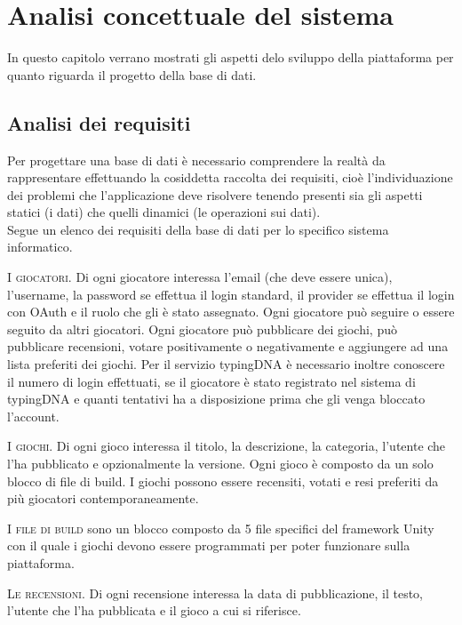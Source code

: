 \chapter{Analisi concettuale del sistema}

In questo capitolo verrano mostrati gli aspetti delo sviluppo della piattaforma per quanto riguarda il progetto della base di dati.\cite{DB}

\section{Analisi dei requisiti}

Per progettare una base di dati è necessario comprendere la realtà da rappresentare effettuando la cosiddetta raccolta dei requisiti, cioè l'individuazione dei problemi che l'applicazione deve risolvere tenendo presenti sia gli aspetti statici (i dati) che quelli dinamici (le operazioni sui dati).\\

Segue un elenco dei requisiti della base di dati per lo specifico sistema informatico. 

\hangindent=1cm
{\scshape I giocatori.} Di ogni giocatore interessa l'email (che deve essere unica), l'username, la password se effettua il login standard, il provider se effettua il login con OAuth e il ruolo che gli è stato assegnato. Ogni giocatore può seguire o essere seguito da altri giocatori. Ogni giocatore può pubblicare dei giochi, può pubblicare recensioni, votare positivamente o negativamente e aggiungere ad una lista preferiti dei giochi. Per il servizio typingDNA è necessario inoltre conoscere il numero di login effettuati, se il giocatore è stato registrato nel sistema di typingDNA e quanti tentativi ha a disposizione prima che gli venga bloccato l'account.

\hangindent=1cm
{\scshape I giochi.} Di ogni gioco interessa il titolo, la descrizione, la categoria, l'utente che l'ha pubblicato e opzionalmente la versione. Ogni gioco è composto da un solo blocco di file di build. I giochi possono essere recensiti, votati e resi preferiti da più giocatori contemporaneamente.

\hangindent=1cm
{\scshape I file di build} sono un blocco composto da 5 file specifici del framework Unity con il quale i giochi devono essere programmati per poter funzionare sulla piattaforma.

\hangindent=1cm
{\scshape Le recensioni.} Di ogni recensione interessa la data di pubblicazione, il testo, l'utente che l'ha pubblicata e il gioco a cui si riferisce.

